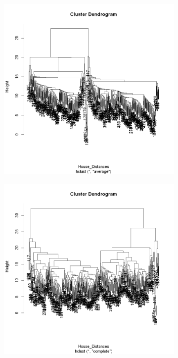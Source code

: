 \documentclass[12pt]{article}
\begin{document}
\begin{figure}[h]
	\caption{Hierarchical clustering dendograms}
	\begin{subfigure}{0.45\textwidth}	
		\includegraphics[width=\textwidth]{Images/dendogram_average}
	\end{subfigure}
	\centering
	\begin{subfigure}{0.45\textwidth}
		
		\includegraphics[width=\textwidth]{Images/dendogram_complete}
	\end{subfigure}
\end{figure}
\end{document}
